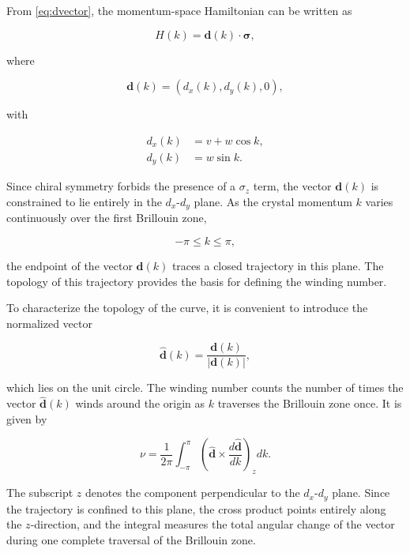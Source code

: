 \documentclass[11pt, a4paper]{article}
\begin{document}
From \cref{eq:dvector}, the momentum-space Hamiltonian can be written as

\begin{equation*}
H(k)=\mathbf{d}(k)\cdot\boldsymbol{\sigma},
\end{equation*}

where

\begin{equation*}
\mathbf{d}(k)=
\left(
d_x(k),
d_y(k),
0
\right),
\end{equation*}

with

\begin{align*}
d_x(k)&=v+w\cos k,\\
d_y(k)&=w\sin k.
\end{align*}

Since chiral symmetry forbids the presence of a \(\sigma_z\) term, the vector
\(\mathbf d(k)\) is constrained to lie entirely in the \(d_x\)-\(d_y\) plane. As the crystal momentum \(k\) varies continuously over the first Brillouin zone,

\[
-\pi\leq k\leq\pi,
\]

the endpoint of the vector \(\mathbf d(k)\) traces a closed trajectory in this plane. The topology of this trajectory provides the basis for defining the winding number.

To characterize the topology of the curve, it is convenient to introduce the normalized vector

\begin{equation*}
\hat{\mathbf d}(k)
=
\frac{\mathbf d(k)}
{|\mathbf d(k)|},
\end{equation*}

which lies on the unit circle. The winding number counts the number of times the vector
\(\hat{\mathbf d}(k)\) winds around the origin as \(k\) traverses the Brillouin zone once. It is given by

\begin{equation}
\nu
=
\frac{1}{2\pi}
\int_{-\pi}^{\pi}
\left(
\hat{\mathbf d}
\times
\frac{d\hat{\mathbf d}}{dk}
\right)_z
dk.
\label{eq:winding}
\end{equation}

The subscript \(z\) denotes the component perpendicular to the \(d_x\)-\(d_y\) plane. Since the trajectory is confined to this plane, the cross product points entirely along the \(z\)-direction, and the integral measures the total angular change of the vector during one complete traversal of the Brillouin zone.
\end{document}
